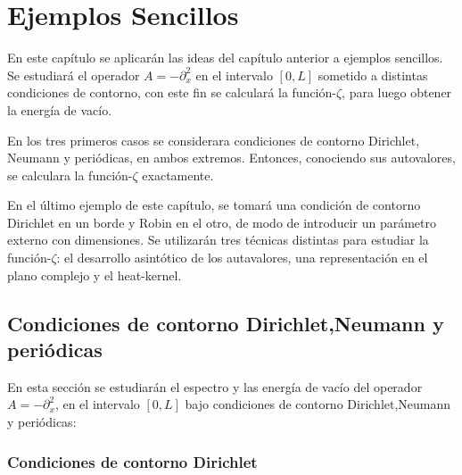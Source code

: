 \chapter{Ejemplos Sencillos}
\label{cap.sencillos}

En este capítulo se aplicarán las ideas del capítulo anterior a ejemplos sencillos. Se estudiará el operador $A = - \partial ^2 _x$ en el intervalo $[0,L]$ sometido a distintas condiciones de contorno, con este fin se calculará la función-$\zeta$, para luego obtener la energía de vacío. 

En los tres primeros casos se considerara condiciones de contorno Dirichlet, Neumann y periódicas, en ambos extremos. Entonces, conociendo sus autovalores, se calculara la función-$\zeta$ exactamente. 

En el último ejemplo de este capítulo, se tomará una condición de contorno Dirichlet en un borde y Robin en el otro, de modo de introducir un parámetro externo con dimensiones. Se utilizarán tres técnicas distintas para estudiar la función-$\zeta$: el desarrollo asintótico de los autavalores, una representación en el plano complejo  y el heat-kernel.

\section{Condiciones de contorno Dirichlet,Neumann y periódicas}
\label{sec.Dirichlet}

En esta sección se estudiarán el espectro y las energía de vacío del operador $A = - \partial ^2 _x$, en el intervalo $[0,L]$ bajo condiciones de contorno Dirichlet,Neumann y periódicas:\\

\subsection*{Condiciones de contorno Dirichlet}


